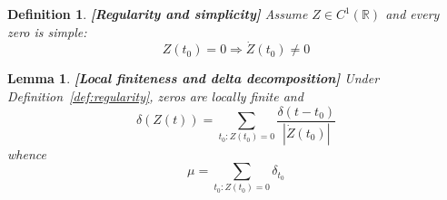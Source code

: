 \documentclass{article}
\newcommand{\tmstrong}[1]{\textbf{#1}}
\newtheorem{definition}{Definition}
\newtheorem{lemma}{Lemma}
\begin{document}
\begin{definition}
  {\tmstrong{[Regularity and simplicity]\label{def:regularity}}} Assume $Z \in
  C^1 (\mathbb{R})$ and every zero is simple:
  \begin{equation}
    Z (t_0) = 0 \Rightarrow \dot{Z} (t_0) \neq 0
  \end{equation}
\end{definition}

\begin{lemma}
  {\tmstrong{[Local finiteness and delta decomposition]\label{lem:delta}
  }}Under Definition~\ref{def:regularity}, zeros are locally finite and
  \begin{equation}
    \delta (Z (t)) = \sum_{t_0 : Z (t_0) = 0} \frac{\delta (t - t_0)}{|
    \dot{Z} (t_0) |}
  \end{equation}
  whence
  \begin{equation}
    \mu = \sum_{t_0 : Z (t_0) = 0} \delta_{t_0}
  \end{equation}
\end{lemma}
\end{document}
